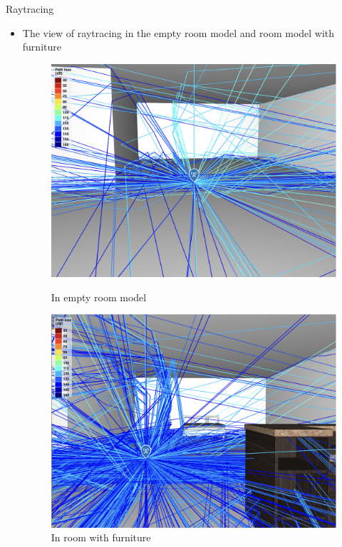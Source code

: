 \documentclass{beamer}
\begin{document}
\begin{frame}[t]{Raytracing}
	\begin{itemize}
	    \item The view of raytracing in the empty room model and room model with furniture
        \vspace{0.5\baselineskip}
            \begin{figure}
                \centering
                \begin{minipage}{0.45\textwidth}
                    \centering
                    \includegraphics[height=0.7\textwidth]{figures/empty_room_simulation_right.png}
                    \caption{In empty room model}
                \end{minipage}
                \begin{minipage}{0.45\textwidth}
                    \centering
                    \includegraphics[height=0.7\textwidth]{figures/furniture_simulation_right.png}
                    \caption{In room with furniture}
                \end{minipage}
            \end{figure}
	\end{itemize}
\end{frame}
\end{document}
